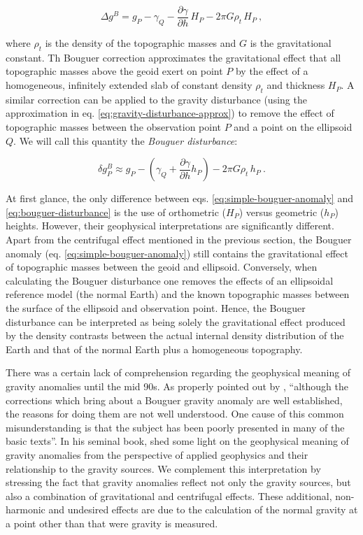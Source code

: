 \documentclass[extra]{gji}
\begin{document}
\begin{equation}
\Delta g^{B} = g_{P}
    - \gamma_{Q}
    - \frac{\partial \gamma}{\partial h} \, H_{P}
    - 2 \pi G \rho_{t} \, H_{P}
     \: ,
\label{eq:simple-bouguer-anomaly}
\end{equation}

\noindent
where $\rho_t$ is the density of the topographic masses and $G$ is the
gravitational constant.
Th Bouguer correction approximates the gravitational effect that all
topographic masses above the geoid exert on point $P$ by the effect of a
homogeneous, infinitely extended slab of constant density $\rho_{t}$ and
thickness $H_{P}$.
A similar correction can be applied to the gravity disturbance
(using the approximation in eq. \ref{eq:gravity-disturbance-approx})
to remove the effect of topographic masses between
the observation point $P$ and a point on the ellipsoid $Q$.
We will call this quantity the \textit{Bouguer disturbance}:

\begin{equation}
\delta g_P^{B} \approx
g_{P} -
\left( \gamma_{Q} + \frac{\partial \gamma}{\partial h} h_P \right)
- 2 \pi G \rho_{t} \, h_{P} \: .
\label{eq:bouguer-disturbance}
\end{equation}

At first glance, the only difference between eqs.
\ref{eq:simple-bouguer-anomaly} and \ref{eq:bouguer-disturbance} is the use of
orthometric ($H_P$) versus geometric ($h_P$) heights.
However, their geophysical interpretations are significantly different.
Apart from the centrifugal effect mentioned in the previous section,
the Bouguer anomaly (eq. \ref{eq:simple-bouguer-anomaly}) still contains
the gravitational effect of topographic masses between the geoid and ellipsoid.
Conversely, when calculating the Bouguer disturbance one removes the effects of
an ellipsoidal reference model (the normal Earth) and the known topographic
masses between the surface of the ellipsoid and observation point.
Hence, the Bouguer disturbance can be interpreted as being solely the
gravitational effect produced by the density contrasts between the actual
internal density distribution of the Earth and that of the normal Earth plus a
homogeneous topography.

There was a certain lack of comprehension regarding the geophysical meaning of
gravity anomalies until the mid 90s.
As properly pointed out by \citet{chapin1996},
``although the corrections which bring about a Bouguer gravity anomaly are well
established, the reasons for doing them are not well understood. One cause of
this common misunderstanding is that the subject has been poorly presented in
many of the basic texts''.
In his seminal book, \citet{blakely1996} shed some light on the geophysical
meaning of gravity anomalies from the perspective of applied geophysics and
their relationship to the gravity sources.
We complement this interpretation by stressing the fact that
gravity anomalies reflect not only the gravity sources,
but also a combination of gravitational and centrifugal effects.
These additional, non-harmonic and undesired effects are due to the calculation
of the normal gravity at a point other than that were gravity is measured.
\end{document}
